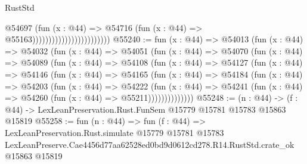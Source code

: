 \begin{lexlean}{RustStd}
\begin{coremodule}
                                              @54697
                                                (fun (x : @44) =>
                                                @54716
                                                  (fun (x : @44) => @55163))))))))))))))))))))))))
@55240 := fun (x : @44) =>
  @54013
    (fun (x : @44) =>
    @54032
      (fun (x : @44) =>
      @54051
        (fun (x : @44) =>
        @54070
          (fun (x : @44) =>
          @54089
            (fun (x : @44) =>
            @54108
              (fun (x : @44) =>
              @54127
                (fun (x : @44) =>
                @54146
                  (fun (x : @44) =>
                  @54165
                    (fun (x : @44) =>
                    @54184
                      (fun (x : @44) =>
                      @54203
                        (fun (x : @44) =>
                        @54222
                          (fun (x : @44) =>
                          @54241 (fun (x : @44) => @54260 (fun (x : @44) => @55211))))))))))))))
@55248 := (n : @44) ->
  (f : @44) -> LexLeanPreservation.Rust.FunSem @15779 @15781 @15783 @15863 @15819
@55258 := fun (n : @44) =>
  fun (f : @44) =>
  LexLeanPreservation.Rust.simulate
    @15779
    @15781
    @15783
    LexLeanPreserve.Cae4456d77aa62528ed0bd9d0612cd278.R14.RustStd.crate_ok
    @15863
    @15819
\end{coremodule}
\end{lexlean}
